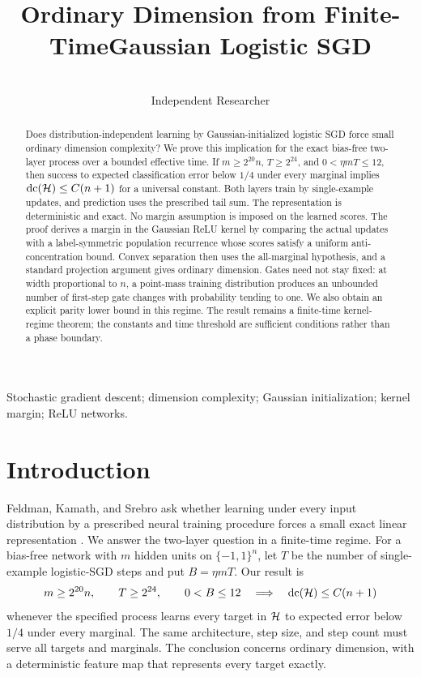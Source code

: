 \documentclass[11pt,letterpaper,pmlr,twoside]{jmlr}
\title[Ordinary Dimension from Gaussian Logistic SGD]{Ordinary Dimension from Finite-Time\titlebreak Gaussian Logistic SGD}
\author[Mausberg]{\Name{Samuel Mausberg}\\\addr Independent Researcher}
\begin{document}
\maketitle
\begin{abstract}
Does distribution-independent learning by Gaussian-initialized logistic SGD force small ordinary dimension complexity? We prove this implication for the exact bias-free two-layer process over a bounded effective time. If $m\ge2^{20}n$, $T\ge2^{24}$, and $0<\eta mT\le12$, then success to expected classification error below $1/4$ under every marginal implies $\operatorname{dc}(\mathcal H)\le C(n+1)$ for a universal constant. Both layers train by single-example updates, and prediction uses the prescribed tail sum. The representation is deterministic and exact. No margin assumption is imposed on the learned scores. The proof derives a margin in the Gaussian ReLU kernel by comparing the actual updates with a label-symmetric population recurrence whose scores satisfy a uniform anti-concentration bound. Convex separation then uses the all-marginal hypothesis, and a standard projection argument gives ordinary dimension. Gates need not stay fixed: at width proportional to $n$, a point-mass training distribution produces an unbounded number of first-step gate changes with probability tending to one. We also obtain an explicit parity lower bound in this regime. The result remains a finite-time kernel-regime theorem; the constants and time threshold are sufficient conditions rather than a phase boundary.
\end{abstract}
\begin{keywords}
Stochastic gradient descent; dimension complexity; Gaussian initialization; kernel margin; ReLU networks.
\end{keywords}

\section{Introduction}
Feldman, Kamath, and Srebro ask whether learning under every input distribution by a prescribed neural training procedure forces a small exact linear representation \citep{FKS26}. We answer the two-layer question in a finite-time regime. For a bias-free network with $m$ hidden units on $\{-1,1\}^n$, let $T$ be the number of single-example logistic-SGD steps and put $B=\eta mT$. Our result is
\begin{equation}
 m\ge2^{20}n,\qquad T\ge2^{24},\qquad 0<B\le12
 \quad\Longrightarrow\quad
 \operatorname{dc}(\mathcal H)\le C(n+1)
 \label{eq:intro}
\end{equation}
whenever the specified process learns every target in $\mathcal H$ to expected error below $1/4$ under every marginal. The same architecture, step size, and step count must serve all targets and marginals. The conclusion concerns ordinary dimension, with a deterministic feature map that represents every target exactly.
\end{document}
